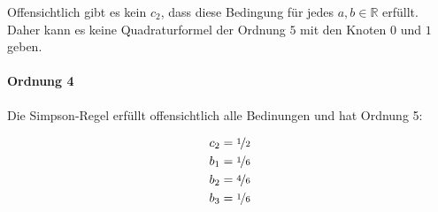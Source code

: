 Offensichtlich gibt es kein $c_2$, dass diese Bedingung für jedes $a,b \in \mathbb{R}$ 
erfüllt. Daher kann es keine Quadraturformel der Ordnung $5$ mit den Knoten
$0$ und $1$ geben.

\paragraph*{Ordnung 4}
Die Simpson-Regel erfüllt offensichtlich alle Bedinungen und hat
Ordnung 5:

\begin{align}
    c_2 &= \nicefrac{1}{2}\\
    b_1 &= \nicefrac{1}{6}\\
    b_2 &= \nicefrac{4}{6}\\
    b_3 &= \nicefrac{1}{6}
\end{align}
